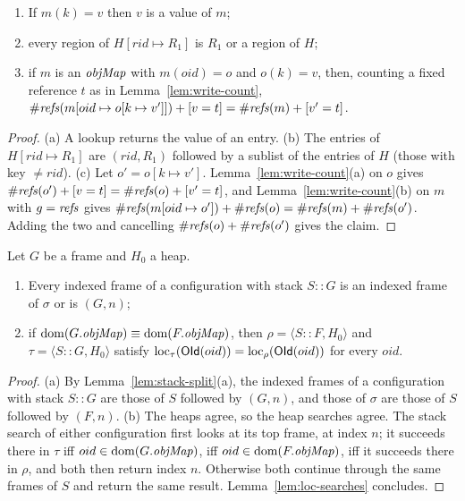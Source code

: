 \begin{lemma}
\label{lem:swap-maps}
\begin{enumerate}[nosep,label=(\alph*)]
  \item If $m(k) = v$ then $v$ is a value of $m$; 
  \item every region of $H[rid \mapsto R_1]$ is $R_1$ or a region of $H$;
  \item if $m$ is an $\mathit{objMap}$ with $m(oid) = o$ and $o(k) = v$, then, counting a fixed reference $t$ as
    in Lemma~\ref{lem:write-count},
    $\#\mathit{refs}(m[oid \mapsto o[k \mapsto v']]) + [v = t] = \#\mathit{refs}(m) + [v' = t]$.
\end{enumerate}
\end{lemma}
\begin{proof}
(a) A lookup returns the value of an entry. (b) The entries of $H[rid \mapsto R_1]$ are
$(rid, R_1)$ followed by a sublist of the entries of $H$ (those with key $\ne rid$). (c) Let
$o' = o[k \mapsto v']$. Lemma~\ref{lem:write-count}(a) on $o$ gives
$\#\mathit{refs}(o') + [v = t] = \#\mathit{refs}(o) + [v' = t]$, and Lemma~\ref{lem:write-count}(b) on $m$ with
$g = \mathit{refs}$ gives $\#\mathit{refs}(m[oid \mapsto o']) + \#\mathit{refs}(o) = \#\mathit{refs}(m) + \#\mathit{refs}(o')$. Adding the two
and cancelling $\#\mathit{refs}(o) + \#\mathit{refs}(o')$ gives the claim.
\end{proof}

\begin{lemma}
\label{lem:swap-top}
Let $G$ be a frame and $H_0$ a heap.
\begin{enumerate}[nosep,label=(\alph*)]
  \item Every indexed frame of a configuration with stack $S :: G$ is an indexed frame of $\sigma$ or
    is $(G, n)$; 
  \item if $\mathrm{dom}(G.\mathit{objMap}) \equiv \mathrm{dom}(F.\mathit{objMap})$, then $\rho = \langle S :: F, H_0\rangle$ and
    $\tau = \langle S :: G, H_0\rangle$ satisfy $\mathrm{loc}_{\tau}(\mathsf{OId}(oid)) = \mathrm{loc}_{\rho}(\mathsf{OId}(oid))$ for
    every $oid$. 
\end{enumerate}
\end{lemma}
\begin{proof}
(a) By Lemma~\ref{lem:stack-split}(a), the indexed frames of a configuration with stack $S :: G$ are
those of $S$ followed by $(G, n)$, and those of $\sigma$ are those of $S$ followed by $(F, n)$.
(b) The heaps agree, so the heap searches agree. The stack search of either configuration first looks
at its top frame, at index $n$; it succeeds there in $\tau$ iff $oid \in \mathrm{dom}(G.\mathit{objMap})$, iff
$oid \in \mathrm{dom}(F.\mathit{objMap})$, iff it succeeds there in $\rho$, and both then return index $n$. Otherwise
both continue through the same frames of $S$ and return the same result.
Lemma~\ref{lem:loc-searches} concludes.
\end{proof}

